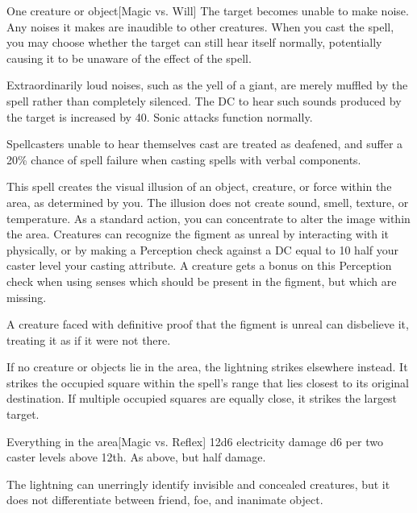 \spellrng{\rngmed}
\spelldur{\durshort \dismissable}
\begin{spelltarget}{One creature or object}[Magic vs. Will]
    \spelleffect The target becomes unable to make noise. Any noises it makes are inaudible to other creatures. When you cast the spell, you may choose whether the target can still hear itself normally, potentially causing it to be unaware of the effect of the spell.

    Extraordinarily loud noises, such as the yell of a giant, are merely muffled by the spell rather than completely silenced. The DC to hear such sounds produced by the target is increased by 40. Sonic attacks function normally.
\end{spelltarget}
\spellnotes Spellcasters unable to hear themselves cast are treated as deafened, and suffer a 20\% chance of spell failure when casting spells with verbal components.

\spelldur{\durshort}
\spellline
\spelleffect This spell creates the visual illusion of an object, creature, or force within the area, as determined by you. The illusion does not create sound, smell, texture, or temperature. As a standard action, you can concentrate to alter the image within the area.
\spellnotes Creatures can recognize the figment as unreal by interacting with it physically, or by making a Perception check against a DC equal to 10 \add half your caster level \add your casting attribute. A creature gets a  bonus on this Perception check when using senses which should be present in the figment, but which are missing.

A creature faced with definitive proof that the figment is unreal can disbelieve it, treating it as if it were not there.

\spellrng{\rngext}
\spellspecial If no creature or objects lie in the area, the lightning strikes elsewhere instead. It strikes the  occupied square within the spell's range that lies closest to its original destination. If multiple occupied squares are equally close, it strikes the largest target.
\begin{spelltargets}{Everything in the area}[Magic vs. Reflex]
    \spellsuccess 12d6 electricity damage \add d6 per two caster levels above 12th.
    \spellfailure As above, but half damage.
\end{spelltargets}
\spellnotes The lightning can unerringly identify invisible and concealed creatures, but it does not differentiate between friend, foe, and inanimate object.

